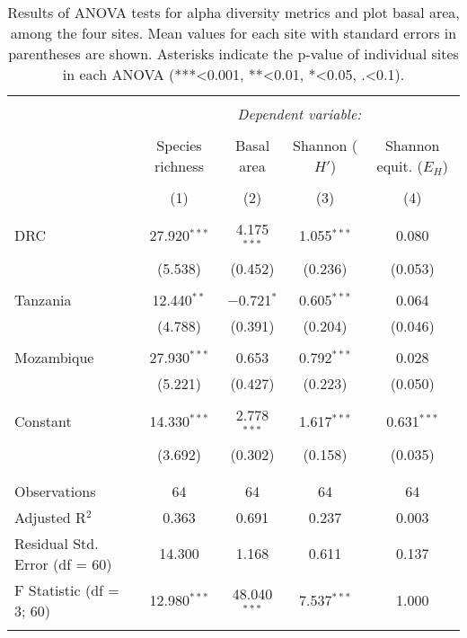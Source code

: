 
\begin{table}[!htbp] \centering 
  \caption{Results of ANOVA tests for alpha diversity metrics and plot basal area, among the four sites. Mean values for each site with standard errors in parentheses are shown. Asterisks indicate the p-value of individual sites in each ANOVA (***<0.001, **<0.01, *<0.05, .<0.1).} 
  \label{anova_table} 
\begin{tabular}{@{\extracolsep{0pt}}lcccc} 
\\[-1.8ex]\hline 
\hline \\[-1.8ex] 
 & \multicolumn{4}{c}{\textit{Dependent variable:}} \\ 
\cline{2-5} 
\\[-1.8ex] & Species richness & Basal area & Shannon ($H'$) & Shannon equit. ($E_{H}$) \\ 
\\[-1.8ex] & (1) & (2) & (3) & (4)\\ 
\hline \\[-1.8ex] 
 DRC & 27.920$^{***}$ & 4.175$^{***}$ & 1.055$^{***}$ & 0.080 \\ 
  & (5.538) & (0.452) & (0.236) & (0.053) \\ 
  & & & & \\ 
 Tanzania & 12.440$^{**}$ & $-$0.721$^{*}$ & 0.605$^{***}$ & 0.064 \\ 
  & (4.788) & (0.391) & (0.204) & (0.046) \\ 
  & & & & \\ 
 Mozambique & 27.930$^{***}$ & 0.653 & 0.792$^{***}$ & 0.028 \\ 
  & (5.221) & (0.427) & (0.223) & (0.050) \\ 
  & & & & \\ 
 Constant & 14.330$^{***}$ & 2.778$^{***}$ & 1.617$^{***}$ & 0.631$^{***}$ \\ 
  & (3.692) & (0.302) & (0.158) & (0.035) \\ 
  & & & & \\ 
\hline \\[-1.8ex] 
Observations & 64 & 64 & 64 & 64 \\ 
Adjusted R$^{2}$ & 0.363 & 0.691 & 0.237 & 0.003 \\ 
Residual Std. Error (df = 60) & 14.300 & 1.168 & 0.611 & 0.137 \\ 
F Statistic (df = 3; 60) & 12.980$^{***}$ & 48.040$^{***}$ & 7.537$^{***}$ & 1.000 \\ 
\hline 
\hline \\[-1.8ex] 
\end{tabular} 
\end{table} 
